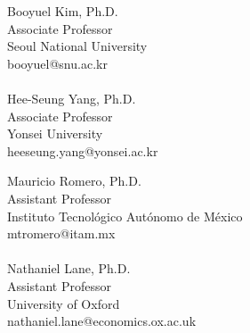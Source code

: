 \documentclass[11pt,article,oneside, a4paper]{memoir}
\begin{document}
\noindent
\begin{minipage}[t]{.5\textwidth}
  \raggedright
  Booyuel Kim, Ph.D.        \\
  Associate Professor       \\
  Seoul National University \\
  booyuel@snu.ac.kr         \\
  ~~                        \\
  Hee-Seung Yang, Ph.D.     \\
  Associate Professor       \\
  Yonsei University         \\
  heeseung.yang@yonsei.ac.kr
\end{minipage}%
\begin{minipage}[t]{.7\textwidth}
\raggedright
  Mauricio Romero, Ph.D.    \\
  Assistant Professor       \\
  Instituto Tecnológico Autónomo de México \\
  mtromero@itam.mx          \\
  ~~                        \\
  Nathaniel Lane, Ph.D.     \\
  Assistant Professor       \\
  University of Oxford      \\
  nathaniel.lane@economics.ox.ac.uk
\end{minipage}
\end{document}

